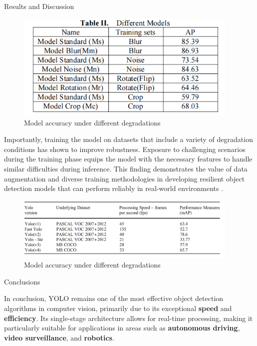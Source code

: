 \documentclass[final]{beamer}
\newlength{\colwidth}
\begin{document}
\begin{frame}[t]
\begin{columns}[t]
\begin{column}{\colwidth}
\begin{block}{Results and Discussion}
    \begin{figure}
    \centering
    \includegraphics[width=0.95\textwidth]{logos/res_poster.png}
    \caption{Model accuracy under different degradations}
    \label{fig:results}
  \end{figure}
  
    Importantly, training the model on datasets that include a variety of degradation conditions has shown to improve robustness. Exposure to challenging scenarios during the training phase equips the model with the necessary features to handle similar difficulties during inference. This finding demonstrates the value of data augmentation and diverse training methodologies in developing resilient object detection models that can perform reliably in real-world environments \cite{7}.
  \end{block}

  \begin{figure}
    \centering
    \includegraphics[width=0.95\textwidth]{logos/yolo.png}
    \caption{Model accuracy under different degradations}
    \label{fig:results}
  \end{figure}
  
\begin{block}{Conclusions}
    \vspace{0.5cm} %
    
    In conclusion, YOLO remains one of the most effective object detection algorithms in computer vision, primarily due to its exceptional \textbf{speed} and \textbf{efficiency}. Its single-stage architecture allows for real-time processing, making it particularly suitable for applications in areas such as \textbf{autonomous driving}, \textbf{video surveillance}, and \textbf{robotics}.


\end{block}
\end{column}
\end{columns}
\end{frame}
\end{document}
